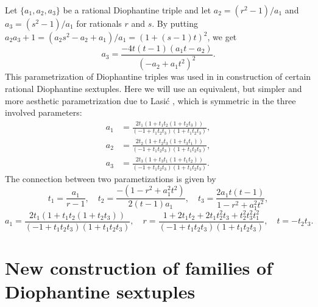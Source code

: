 \documentclass[a4paper]{amsart}
\theoremstyle{plain}
\theoremstyle{definition}
\begin{document}
Let $\{a_1,a_2,a_3\}$ be a rational Diophantine triple and let $a_2=(r^2-1)/a_1$ and $a_3=(s^2-1)/a_1$
for rationals $r$ and $s$. By putting $a_2a_3+1=(a_2s^2-a_2+a_1)/a_1 = (1+(s-1)t)^2$, we get
$$ a_3=\frac{-4t(t-1)(a_1t-a_2)}{(-a_2+a_1t^2)^2}. $$
This parametrization of Diophantine triples was used in \cite{duje-sext} in construction of certain
rational Diophantine sextuples. Here we will use an equivalent, but simpler and more aesthetic parametrization
due to Lasi\'c \cite{luka}, which is symmetric in the three involved parameters:
\begin{align*}
a_1 &=  \frac{2 t_1 (1 + t_1 t_2 (1 + t_2 t_3))} {(-1 + t_1 t_2 t_3) (1 + t_1 t_2 t_3)}, \\
a_2 &=  \frac{2 t_2 (1 + t_2 t_3 (1 + t_3 t_1))} {(-1 + t_1 t_2 t_3) (1 + t_1 t_2 t_3)}, \\
a_3 &=  \frac{2 t_3 (1 + t_3 t_1 (1 + t_1 t_2))} {(-1 + t_1 t_2 t_3) (1 + t_1 t_2 t_3)}.
\end{align*}
The connection between two parametizations is given by
$$ t_1 = \frac{a_1}{r-1}, \quad
t_2 = \frac{-(1-r^2+a_1^2 t^2)}{2(t-1)a_1}, \quad
t_3 = \frac{2a_1 t(t-1)}{1-r^2+a_1^2 t^2}, $$
$$ a_1 =  \frac{2 t_1 (1 + t_1 t_2 (1 + t_2 t_3))} {(-1 + t_1 t_2 t_3) (1 + t_1 t_2 t_3)}, \quad
r = \frac{1+2t_1t_2+2t_1t_2^2t_3+t_2^2t_3^2t_1^2}{(-1+t_1t_2t_3)(1+t_1t_2t_3)},\quad
t = -t_2 t_3. $$

\section{New construction of families of Diophantine sextuples} \label{sec:sextuples}
\end{document}
